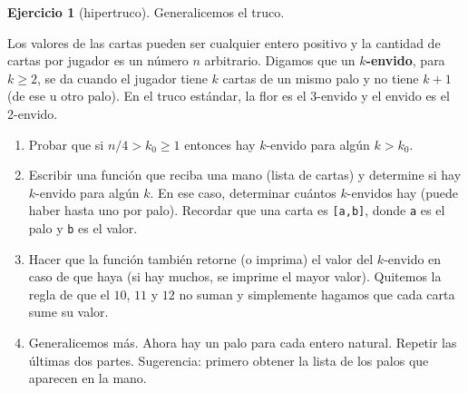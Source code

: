 \documentclass[a4paper,12pt]{book}
\theoremstyle{definition}
\newtheorem{ejercicio}{Ejercicio}
\begin{document}
	\begin{ejercicio}[hipertruco]
		Generalicemos el truco.
		
		Los valores de las cartas pueden ser cualquier entero positivo y la cantidad de cartas por jugador es un número $n$ arbitrario. Digamos que un {\bf $k$-envido}, para $k\geq 2$, se da cuando el jugador tiene $k$ cartas de un mismo palo y no tiene $k+1$ (de ese u otro palo). En el truco estándar, la flor es el 3-envido y el envido es el 2-envido.
		
		\begin{enumerate}
			\item Probar que si $n/4>k_0\geq 1$ entonces hay $k$-envido para algún $k> k_0$.
			\item Escribir una función que reciba una mano (lista de cartas) y determine si hay $k$-envido para algún $k$. En ese caso, determinar cuántos $k$-envidos hay (puede haber hasta uno por palo). Recordar que una carta es {\tt [a,b]}, donde {\tt a} es el palo y {\tt b} es el valor.
			\item Hacer que la función también retorne (o imprima) el valor del $k$-envido en caso de que haya (si hay muchos, se imprime el mayor valor). Quitemos la regla de que el $10$, $11$ y $12$ no suman y simplemente hagamos que cada carta sume su valor.
			\item Generalicemos más. Ahora hay un palo para cada entero natural. Repetir las últimas dos partes. Sugerencia: primero obtener la lista de los palos que aparecen en la mano.
		\end{enumerate}
	\end{ejercicio}
	
\end{document}
